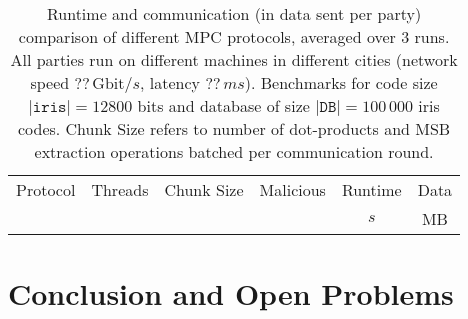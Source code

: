 \documentclass[a4paper,11pt,
]{article}
\newcommand{\cmark}{\ding{51}}%
\newcommand{\xmark}{\ding{55}}%
\begin{document}
\begin{table}[ht]
    \centering
    \caption{Runtime and communication (in data sent per party) comparison of different MPC protocols, averaged over 3 runs. All parties run on different machines in different cities (network speed $??\,\text{Gbit}/s$, latency $??\,ms$). Benchmarks for code size $|\texttt{iris}| = 12800$ bits and database of size $|\texttt{DB}| = 100\,000$ iris codes. Chunk Size refers to number of dot-products and MSB extraction operations batched per communication round.}
    \label{tab::bench_network_100k_city}
    \begin{tabular}{lrrcrr}
        \toprule
        \multicolumn{1}{c}{Protocol} & \multicolumn{1}{c}{Threads} & \multicolumn{1}{c}{Chunk Size} & \multicolumn{1}{c}{Malicious} & \multicolumn{1}{c}{Runtime} & \multicolumn{1}{c}{Data} \\
                                     &                             &                                &                               & \multicolumn{1}{c}{$s$}     & \multicolumn{1}{c}{MB}   \\
        \midrule
        \bottomrule
    \end{tabular}
\end{table}

\section{Conclusion and Open Problems}
\end{document}
